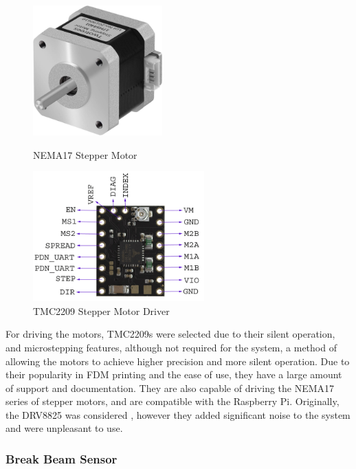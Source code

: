 \begin{figure}[H]
    \hfill
    \begin{minipage}[t]{0.45\textwidth}
      \centering
      \includegraphics[width=\textwidth,height=5cm, keepaspectratio]{imgs/parts/nema17.jpg}
      \caption{NEMA17 Stepper Motor \cite{nema17}}
      \label{fig:nema17}
    \end{minipage}
    \hfill
    \begin{minipage}[t]{0.45\textwidth}
        \centering
        \includegraphics[width=\textwidth,height=5cm, keepaspectratio]{imgs/parts/tmc2209.png}
        \caption{TMC2209 Stepper Motor Driver \cite{tmc2209}}
        \label{fig:tmc2209}
      \end{minipage}
      \hfill
\end{figure}

For driving the motors, TMC2209s were selected due to their silent operation, and microstepping features, although not required for the system, a method of allowing the motors to achieve higher precision and more silent operation. Due to their popularity in FDM printing and the ease of use, they have a large amount of support and documentation. They are also capable of driving the NEMA17 series of stepper motors, and are compatible with the Raspberry Pi. Originally, the DRV8825 was considered \cite{drv8825}, however they added significant noise to the system and were unpleasant to use.

\subsubsection{Break Beam Sensor}
\label{sec:break-beam-sensor}

